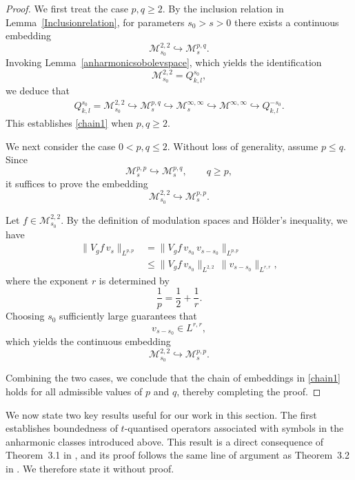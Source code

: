 \documentclass[12pt,reqno,a4paper]{amsart}
\numberwithin{equation}{section}
\theoremstyle{plain}
\theoremstyle{definition}
\theoremstyle{remark}
\begin{document}
\begin{proof}
We first treat the case $p,q\geq 2$. By the inclusion relation in Lemma~\ref{Inclusionrelation}, for parameters $s_{0}>s>0$ there exists a continuous embedding
\[
\mathcal{M}^{2,2}_{s_{0}}
\hookrightarrow
\mathcal{M}^{p,q}_{s}.
\]
Invoking Lemma~\ref{anharmonicsobolevspace}, which yields the identification
\[
\mathcal{M}^{2,2}_{s_{0}}
=
Q^{s_{0}}_{k,l},
\]
we deduce that
\begin{align}
\label{chain}
Q^{s_{0}}_{k,l}
=
\mathcal{M}^{2,2}_{s_{0}}
\hookrightarrow
\mathcal{M}^{p,q}_{s}
\hookrightarrow
\mathcal{M}^{\infty,\infty}_{s}
\hookrightarrow
\mathcal{M}^{\infty,\infty}
\hookrightarrow
Q^{-s_{0}}_{k,l}.
\end{align}
This establishes \eqref{chain1} when $p,q\geq 2$.

We next consider the case $0<p,q\leq 2$. Without loss of generality, assume $p\leq q$. Since
\[
\mathcal{M}^{p,p}_{s}
\hookrightarrow
\mathcal{M}^{p,q}_{s},
\qquad q\geq p,
\]
it suffices to prove the embedding
\[
\mathcal{M}^{2,2}_{s_{0}}
\hookrightarrow
\mathcal{M}^{p,p}_{s}.
\]

Let $f\in \mathcal{M}^{2,2}_{s_{0}}$. By the definition of modulation spaces and Hölder's inequality, we have
\begin{align*}
\|V_{g}f\, v_{s}\|_{L^{p,p}}
&=
\|V_{g}f\, v_{s_{0}}\, v_{s-s_{0}}\|_{L^{p,p}} \\
&\leq
\|V_{g}f\, v_{s_{0}}\|_{L^{2,2}}
\,
\|v_{s-s_{0}}\|_{L^{r,r}},
\end{align*}
where the exponent $r$ is determined by
\[
\frac{1}{p}
=
\frac{1}{2}
+
\frac{1}{r}.
\]
Choosing $s_{0}$ sufficiently large guarantees that
\[
v_{s-s_{0}}
\in
L^{r,r},
\]
which yields the continuous embedding
\[
\mathcal{M}^{2,2}_{s_{0}}
\hookrightarrow
\mathcal{M}^{p,p}_{s}.
\]

Combining the two cases, we conclude that the chain of embeddings in \eqref{chain1} holds for all admissible values of $p$ and $q$, thereby completing the proof.
\end{proof}

We now state two key results useful for our work in this section. The first establishes boundedness of 
$t$-quantised operators associated with symbols in the anharmonic classes introduced above. This result is a direct consequence of Theorem~3.1 in \cite{MR3636061}, and its proof follows the same line of argument as Theorem~3.2 in \cite{MR4944933}. We therefore state it without proof.
\end{document}
